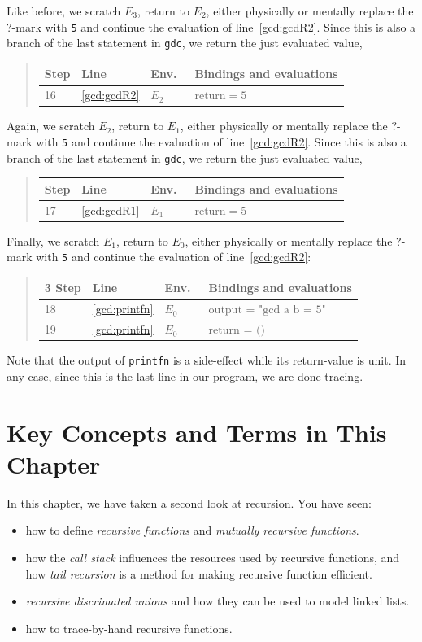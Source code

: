 \documentclass[fsharpNotes.tex]{subfiles}
\begin{document}
Like before, we scratch $E_3$, return to $E_2$, either physically or mentally replace the ?-mark with \lstinline!5! and continue the evaluation of line~\ref{gcd:gcdR2}. Since this is also a branch of the last statement in \lstinline{gdc}, we return the just evaluated value,
\begin{quote}
  \begin{tabular*}{0.6\linewidth}{l|lll}
    Step & Line & Env.\ & Bindings and evaluations\\
    \hline
    16&\ref{gcd:gcdR2} & $E_2$ & $\text{return} = 5$\\
  \end{tabular*}
\end{quote}
Again, we scratch $E_2$, return to $E_1$, either physically or mentally replace the ?-mark with \lstinline!5! and continue the evaluation of line~\ref{gcd:gcdR2}. Since this is also a branch of the last statement in \lstinline{gdc}, we return the just evaluated value,
\begin{quote}
  \begin{tabular*}{0.6\linewidth}{l|lll}
    Step & Line & Env.\ & Bindings and evaluations\\
    \hline
    17&\ref{gcd:gcdR1} & $E_1$ & $\text{return} = 5$\\
  \end{tabular*}
\end{quote}
Finally, we scratch $E_1$, return to $E_0$, either physically or mentally replace the ?-mark with \lstinline!5! and continue the evaluation of line~\ref{gcd:gcdR2}:
\begin{quote}
  \begin{tabular*}{0.6\linewidth}{l|lll}3
    Step & Line & Env.\ & Bindings and evaluations\\
    \hline
    18 & \ref{gcd:printfn} & $E_0$ & $\text{output = "gcd a b = 5"}$\\
    19 & \ref{gcd:printfn} & $E_0$ & $\text{return = ()}$\\
  \end{tabular*}
\end{quote}
Note that the output of \lstinline{printfn} is a side-effect while its return-value is unit. In any case, since this is the last line in our program, we are done tracing.

\section{Key Concepts and Terms in This Chapter}
In this chapter, we have taken a second look at recursion. You have seen:
\begin{itemize}
\item how to define \emph{recursive functions} and \emph{mutually recursive functions}.
\item how the \emph{call stack} influences the resources used by recursive functions, and how \emph{tail recursion} is a method for making recursive function efficient.
\item \emph{recursive discrimated unions} and how they can be used to model linked lists.
\item how to trace-by-hand recursive functions.
\end{itemize}
\end{document}
